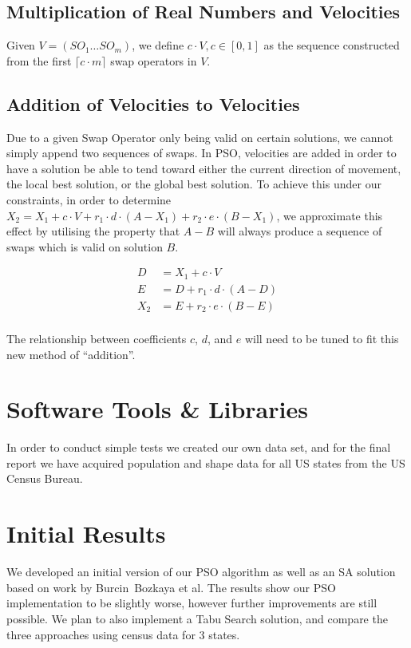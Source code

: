 \documentclass[journal]{IEEEtran}
\begin{document}
\subsection{Multiplication of Real Numbers and Velocities}
Given $V = (SO_1 \dots SO_m)$, we define $c \cdot V, c \in [0, 1]$ as the
sequence constructed from the first $\lceil c \cdot m \rceil$ swap operators in $V$.

\subsection{Addition of Velocities to Velocities}
Due to a given Swap Operator only being valid on certain solutions, we cannot
simply append two sequences of swaps.  In PSO, velocities are added in order to
have a solution be able to tend toward either the current direction of movement,
the local best solution, or the global best solution.  To achieve this under our
constraints, in order to determine $X_2 = X_1 + c\cdot V + r_1 \cdot d \cdot (A
- X_1) + r_2 \cdot e \cdot (B - X_1)$, we approximate this effect by utilising
the property that $A - B$ will always produce a sequence of swaps which is valid
on solution $B$.

\begin{equation}
\label{vel_encoding}
    \begin{aligned}
        D &= X_1 + c \cdot V\\
        E &= D + r_1 \cdot d \cdot (A - D)\\
        X_2 &= E + r_2 \cdot e \cdot (B - E)\\
    \end{aligned}
\end{equation}

The relationship between coefficients $c$, $d$, and $e$ will need to be tuned to fit this new method of
``addition''.

\section{Software Tools \& Libraries}
In order to conduct simple tests we created our own data set, and for the final
report we have acquired population and shape data for all US states from the
US Census Bureau.

\section{Initial Results}
We developed an initial version of our PSO algorithm as well as an SA
solution based on work by Burcin~Bozkaya et al\cite{local-search}.  The
results show our PSO implementation to be slightly worse, however further
improvements are still possible.  We plan to also implement a Tabu Search
solution, and compare the three approaches using census data for 3 states.
\end{document}
